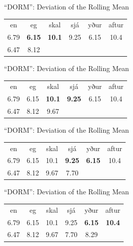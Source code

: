 \documentclass[hyperref={pdfpagelabels=false}]{beamer}
\begin{document}
\begin{frame}{``DORM'': Deviation of the Rolling Mean} 
	
	\begin{center}
		\begin{tabular}{c c c c c c}
			en & eg & skal & sjá & yður & aftur \\
			6.79 & \textbf{6.15} & \textbf{10.1} & 9.25 & 6.15 & 10.4\\
			6.47 & 8.12 & & & & 
		\end{tabular}
	\end{center}
	
\end{frame}

\begin{frame}{``DORM'': Deviation of the Rolling Mean} 
	
	\begin{center}
		\begin{tabular}{c c c c c c}
			en & eg & skal & sjá & yður & aftur \\
			6.79 & 6.15 & \textbf{10.1} & \textbf{9.25} & 6.15 & 10.4\\
			6.47 & 8.12 & 9.67 & & & 
		\end{tabular}
	\end{center}
	
\end{frame}

\begin{frame}{``DORM'': Deviation of the Rolling Mean} 
	
	\begin{center}
		\begin{tabular}{c c c c c c}
			en & eg & skal & sjá & yður & aftur \\
			6.79 & 6.15 & 10.1 & \textbf{9.25} & \textbf{6.15} & 10.4\\
			6.47 & 8.12 & 9.67 & 7.70 & & 
		\end{tabular}
	\end{center}
	
\end{frame}

\begin{frame}{``DORM'': Deviation of the Rolling Mean} 
	
	\begin{center}
		\begin{tabular}{c c c c c c}
			en & eg & skal & sjá & yður & aftur \\
			6.79 & 6.15 & 10.1 & 9.25 & \textbf{6.15} & \textbf{10.4}\\
			6.47 & 8.12 & 9.67 & 7.70 & 8.29 & \\
		\end{tabular}
	\end{center}
	
\end{frame}
\end{document}
